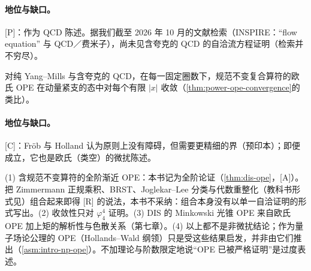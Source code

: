 \paragraph{地位与缺口。}[P]：作为 QCD 陈述。据我们截至 2026 年 10 月的文献检索（INSPIRE：“flow equation” 与 QCD／费米子），尚未见含夸克的 QCD 的自洽流方程证明（检索并不穷尽）。

\begin{conjecture}\label{conj:front-ope-convergence}
对纯 Yang--Mills 与含夸克的 QCD，在每一固定圈数下，规范不变复合算符的欧氏 OPE 在动量紧支的态中对每个有限 $|x|$ 收敛（\cref{thm:power-ope-convergence}的类比）。
\end{conjecture}

\paragraph{地位与缺口。}[C]：Fröb 与 Holland 认为原则上没有障碍，但需要更精细的界\cite{Frob:2016mzv}（预印本）；即便成立，它也是欧氏（类空）的微扰陈述。

\begin{remark}\label{rem:front-ope-qcd-status}
(1) 含规范不变算符的全阶渐近 OPE：本书记为全阶论证（\cref{thm:dis-ope}，[A]）。把 Zimmermann 正规乘积\cite{Zimmermann1973}、BRST、Joglekar--Lee 分类\cite{Joglekar:1975nu}与代数重整化\cite{Piguet:1995er}（教科书形式见\cite{Collins1984}）组合起来即得 [R] 的说法，本书不采纳：组合本身没有以单一自洽证明的形式写出。(2) 收敛性只对 $\varphi^4_4$ 证明。(3) DIS 的 Minkowski 光锥 OPE 来自欧氏 OPE 加上矩的解析性与色散关系（第七章）。(4) 以上都不是非微扰结论；作为量子场论公理的 OPE（Hollands--Wald 纲领）只是受这些结果启发，并非由它们推出（\cref{asm:intro-np-ope}）。不加理论与阶数限定地说“OPE 已被严格证明”是过度表述。
\end{remark}
